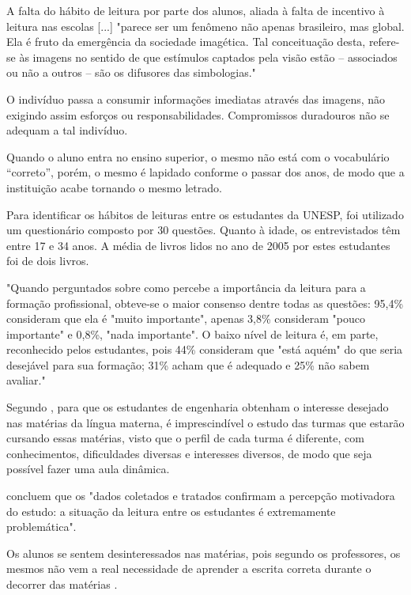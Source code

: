 \documentclass[
	article,			%
	11pt,				%
	oneside,			%
	a4paper,			%
	english,			%
	brazil,				%
	sumario=tradicional
	]{abntex2}
\begin{document}
A falta do hábito de leitura por parte dos alunos, aliada à falta de incentivo à leitura nas escolas [...] "parece ser um fenômeno não apenas brasileiro, mas global. Ela é fruto da emergência da sociedade imagética. Tal conceituação desta, refere-se às imagens no sentido de que estímulos captados pela visão estão – associados ou não a outros – são os difusores das simbologias." \cite[p.9.132]{habitosleit}

O indivíduo passa a consumir informações imediatas através das imagens, não exigindo assim esforços ou responsabilidades. Compromissos duradouros não se adequam a tal indivíduo.

Quando o aluno entra no ensino superior, o mesmo não está com o vocabulário “correto”, porém, o mesmo é lapidado conforme o passar dos anos, de modo que a instituição acabe tornando o mesmo letrado. \cite{FichamentoBili}

Para identificar os hábitos de leituras entre os estudantes da UNESP, foi utilizado um questionário composto por 30 questões.
Quanto à idade, os entrevistados têm entre 17 e 34 anos. A média de livros lidos no ano de 2005 por estes estudantes foi de dois livros. 

"Quando perguntados sobre como percebe a importância da leitura para a formação profissional, obteve-se o maior consenso dentre todas as questões: 95,4\% consideram que ela é "muito importante", apenas 3,8\% consideram "pouco importante" e 0,8\%, "nada importante". O baixo nível de leitura é, em parte, reconhecido pelos estudantes, pois 44\% consideram que "está aquém" do que seria desejável para sua formação; 31\% acham que é adequado e 25\% não sabem avaliar." \cite[p.9.141]{habitosleit}

Segundo , para que os estudantes de engenharia obtenham o interesse desejado nas matérias da língua materna, é imprescindível o estudo das turmas que estarão cursando essas matérias, visto que o perfil de cada turma é diferente, com conhecimentos, dificuldades diversas e interesses diversos, de modo que seja possível fazer uma aula dinâmica.

 concluem que os "dados coletados e tratados confirmam a percepção motivadora do estudo: a situação da leitura entre os estudantes é extremamente problemática".

Os alunos se sentem desinteressados nas matérias, pois segundo os professores, os mesmos não vem a real necessidade de aprender a escrita correta durante o decorrer das matérias \cite{FichamentoBili}.
\end{document}
